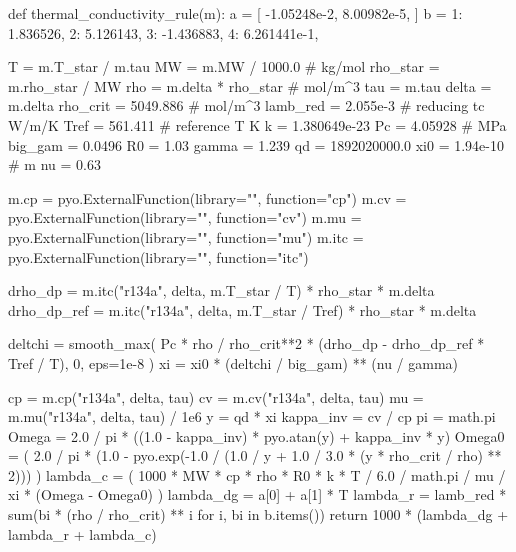 \documentclass[oneside]{book}
\begin{document}
\begin{python}
def thermal_conductivity_rule(m):
    a = [
        -1.05248e-2,
        8.00982e-5,
    ]
    b = {
        1: 1.836526,
        2: 5.126143,
        3: -1.436883,
        4: 6.261441e-1,
    }

    T = m.T_star / m.tau
    MW = m.MW / 1000.0  # kg/mol
    rho_star = m.rho_star / MW
    rho = m.delta * rho_star  # mol/m^3
    tau = m.tau
    delta = m.delta
    rho_crit = 5049.886  # mol/m^3
    lamb_red = 2.055e-3  # reducing tc W/m/K
    Tref = 561.411  # reference T K
    k = 1.380649e-23
    Pc = 4.05928  # MPa
    big_gam = 0.0496
    R0 = 1.03
    gamma = 1.239
    qd = 1892020000.0
    xi0 = 1.94e-10  # m
    nu = 0.63

    m.cp = pyo.ExternalFunction(library="", function="cp")
    m.cv = pyo.ExternalFunction(library="", function="cv")
    m.mu = pyo.ExternalFunction(library="", function="mu")
    m.itc = pyo.ExternalFunction(library="", function="itc")

    drho_dp = m.itc("r134a", delta, m.T_star / T) * rho_star * m.delta
    drho_dp_ref = m.itc("r134a", delta, m.T_star / Tref) * rho_star * m.delta

    deltchi = smooth_max(
        Pc * rho / rho_crit**2 * (drho_dp - drho_dp_ref * Tref / T), 0, eps=1e-8
    )
    xi = xi0 * (deltchi / big_gam) ** (nu / gamma)

    cp = m.cp("r134a", delta, tau)
    cv = m.cv("r134a", delta, tau)
    mu = m.mu("r134a", delta, tau) / 1e6
    y = qd * xi
    kappa_inv = cv / cp
    pi = math.pi
    Omega = 2.0 / pi * ((1.0 - kappa_inv) * pyo.atan(y) + kappa_inv * y)
    Omega0 = (
        2.0
        / pi
        * (1.0 - pyo.exp(-1.0 / (1.0 / y + 1.0 / 3.0 * (y * rho_crit / rho) ** 2)))
    )
    lambda_c = (
        1000 * MW * cp * rho * R0 * k * T / 6.0 / math.pi / mu / xi * (Omega - Omega0)
    )
    lambda_dg = a[0] + a[1] * T
    lambda_r = lamb_red * sum(bi * (rho / rho_crit) ** i for i, bi in b.items())
    return 1000 * (lambda_dg + lambda_r + lambda_c)



\end{python}
\end{document}
